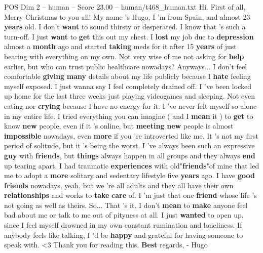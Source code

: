 \begin{textsample}{POS Dim 2 – human – Score 23.00 – human/t468\_human.txt}  \label{ex:f2_pos_026}
Hi.
First of all, Merry Christmas to you all!
My name 's Hugo, I 'm from Spain, and almost 23 \textbf{years} old.
I don't \textbf{want} to sound thirsty or desperated.
I know that 's such a turn-off.
I just \textbf{want} to \textbf{get} this out my chest.
I \textbf{lost} my job due to \textbf{depression} almost a \textbf{month} ago and started \textbf{taking} meds for it after 15 \textbf{years} of just bearing with everything on my own.
Not very wise of me not asking for \textbf{help} earlier, but who can trust public healthcare nowadays?
Anyways...
I don't feel comfortable \textbf{giving} \textbf{many} details about my life publicly because I \textbf{hate} feeling myself exposed.
I just wanna say I feel completely drained off.
I 've been locked up home for the last three weeks just playing videogames and sleeping.
Not even eating nor \textbf{crying} because I have no energy for it.
I 've never felt myself so alone in my entire life.
I tried everything you can imagine ( and I \textbf{mean} it ) to \textbf{get} to know \textbf{new} people, even if it 's online, but \textbf{meeting} \textbf{new} people is almost \textbf{impossible} nowadays, even \textbf{more} if you 're introverted like me.
It 's not my first period of solitude, but it 's being the worst.
I 've always been such an expressive \textbf{guy} with \textbf{friends}, but \textbf{things} always happen in all groups and they always \textbf{end} up tearing apart.
I had traumatic \textbf{experiences} with old"\textbf{friends}"of mine that led me to adopt a \textbf{more} solitary and sedentary lifestyle five \textbf{years} ago.
I have \textbf{good} \textbf{friends} nowadays, yeah, but we 're all adults and they all have their own \textbf{relationships} and works to \textbf{take} \textbf{care} of.
I 'm just that one \textbf{friend} whose life 's not going as well as theirs.
So...
That 's it.
I don't \textbf{mean} to \textbf{make} anyone feel bad about me or talk to me out of pityness at all.
I just \textbf{wanted} to open up, since I feel myself drowned in my own constant rumination and loneliness.
If anybody feels like talking, I 'd be \textbf{happy} and grateful for having someone to speak with. <3 Thank you for reading this. \textbf{Best} regards, - Hugo {\EmojiFont 💜}

\end{textsample}
